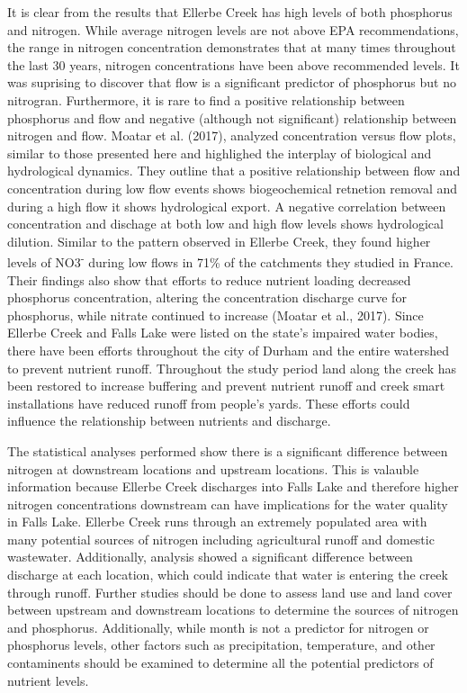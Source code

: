 \documentclass[12pt,]{article}
\begin{document}
It is clear from the results that Ellerbe Creek has high levels of both
phosphorus and nitrogen. While average nitrogen levels are not above EPA
recommendations, the range in nitrogen concentration demonstrates that
at many times throughout the last 30 years, nitrogen concentrations have
been above recommended levels. It was suprising to discover that flow is
a significant predictor of phosphorus but no nitrogran. Furthermore, it
is rare to find a positive relationship between phosphorus and flow and
negative (although not significant) relationship between nitrogen and
flow. Moatar et al. (2017), analyzed concentration versus flow plots,
similar to those presented here and highlighed the interplay of
biological and hydrological dynamics. They outline that a positive
relationship between flow and concentration during low flow events shows
biogeochemical retnetion removal and during a high flow it shows
hydrological export. A negative correlation between concentration and
dischage at both low and high flow levels shows hydrological dilution.
Similar to the pattern observed in Ellerbe Creek, they found higher
levels of NO3\textsuperscript{-} during low flows in 71\% of the
catchments they studied in France. Their findings also show that efforts
to reduce nutrient loading decreased phosphorus concentration, altering
the concentration discharge curve for phosphorus, while nitrate
continued to increase (Moatar et al., 2017). Since Ellerbe Creek and
Falls Lake were listed on the state's impaired water bodies, there have
been efforts throughout the city of Durham and the entire watershed to
prevent nutrient runoff. Throughout the study period land along the
creek has been restored to increase buffering and prevent nutrient
runoff and creek smart installations have reduced runoff from people's
yards. These efforts could influence the relationship between nutrients
and discharge.

The statistical analyses performed show there is a significant
difference between nitrogen at downstream locations and upstream
locations. This is valauble information because Ellerbe Creek discharges
into Falls Lake and therefore higher nitrogen concentrations downstream
can have implications for the water quality in Falls Lake. Ellerbe Creek
runs through an extremely populated area with many potential sources of
nitrogen including agricultural runoff and domestic wastewater.
Additionally, analysis showed a significant difference between discharge
at each location, which could indicate that water is entering the creek
through runoff. Further studies should be done to assess land use and
land cover between upstream and downstream locations to determine the
sources of nitrogen and phosphorus. Additionally, while month is not a
predictor for nitrogen or phosphorus levels, other factors such as
precipitation, temperature, and other contaminents should be examined to
determine all the potential predictors of nutrient levels.
\end{document}
